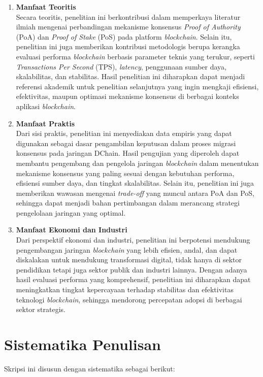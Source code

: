 \begin{enumerate}
    \item \textbf{Manfaat Teoritis} \\
    Secara teoritis, penelitian ini berkontribusi dalam memperkaya literatur ilmiah mengenai perbandingan mekanisme konsensus \textit{Proof of Authority} (PoA) dan \textit{Proof of Stake} (PoS) pada platform \textit{blockchain}. Selain itu, penelitian ini juga memberikan kontribusi metodologis berupa kerangka evaluasi performa \textit{blockchain} berbasis parameter teknis yang terukur, seperti \textit{Transactions Per Second} (TPS), \textit{latency}, penggunaan sumber daya, skalabilitas, dan stabilitas. Hasil penelitian ini diharapkan dapat menjadi referensi akademik untuk penelitian selanjutnya yang ingin mengkaji efisiensi, efektivitas, maupun optimasi mekanisme konsensus di berbagai konteks aplikasi \textit{blockchain}.

    \item \textbf{Manfaat Praktis} \\
    Dari sisi praktis, penelitian ini menyediakan data empiris yang dapat digunakan sebagai dasar pengambilan keputusan dalam proses migrasi konsensus pada jaringan DChain. Hasil pengujian yang diperoleh dapat membantu pengembang dan pengelola jaringan \textit{blockchain} dalam menentukan mekanisme konsensus yang paling sesuai dengan kebutuhan performa, efisiensi sumber daya, dan tingkat skalabilitas. Selain itu, penelitian ini juga memberikan wawasan mengenai \textit{trade-off} yang muncul antara PoA dan PoS, sehingga dapat menjadi bahan pertimbangan dalam merancang strategi pengelolaan jaringan yang optimal.

    \item \textbf{Manfaat Ekonomi dan Industri} \\
    Dari perspektif ekonomi dan industri, penelitian ini berpotensi mendukung pengembangan jaringan \textit{blockchain} yang lebih efisien, andal, dan dapat diskalakan untuk mendukung transformasi digital, tidak hanya di sektor pendidikan tetapi juga sektor publik dan industri lainnya. Dengan adanya hasil evaluasi performa yang komprehensif, penelitian ini diharapkan dapat meningkatkan tingkat kepercayaan terhadap stabilitas dan efektivitas teknologi \textit{blockchain}, sehingga mendorong percepatan adopsi di berbagai sektor strategis.
\end{enumerate}

\section{Sistematika Penulisan}
Skripsi ini disusun dengan sistematika sebagai berikut:

